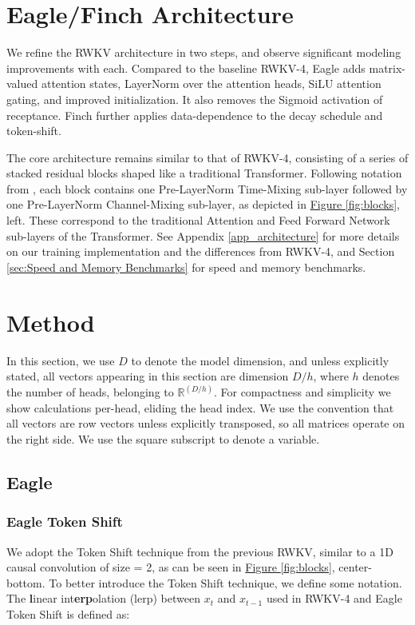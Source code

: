 \section{Eagle/Finch Architecture}\label{sec:rwkv_model}
We refine the RWKV architecture in two steps, and observe significant modeling improvements with each. Compared to the baseline RWKV-4, Eagle adds matrix-valued attention states, LayerNorm over the attention heads, SiLU attention gating, and improved initialization. It also removes the Sigmoid activation of receptance. Finch further applies data-dependence to the decay schedule and token-shift.

The core architecture remains similar to that of RWKV-4, consisting of a series of stacked residual blocks shaped like a traditional Transformer. Following notation from \citep{NEURIPS2021mixer}, each block contains one Pre-LayerNorm Time-Mixing sub-layer followed by one Pre-LayerNorm Channel-Mixing sub-layer, as depicted in \hyperref[fig:blocks]{Figure \ref*{fig:blocks}}, left. These correspond to the traditional Attention and Feed Forward Network sub-layers of the Transformer. See Appendix \ref{app_architecture} for more details on our training implementation and the differences from RWKV-4, and Section \ref{sec:Speed and Memory Benchmarks} for speed and memory benchmarks.

\section{Method}\label{sec:method}
In this section, we use $D$ to denote the model dimension, and unless explicitly stated, all vectors appearing in this section are dimension $D/h$, where $h$ denotes the number of heads, belonging to $\mathbb{R}^{(D/h)}$. For compactness and simplicity we show calculations per-head, eliding the head index. We use the convention that all vectors are row vectors unless explicitly transposed, so all matrices operate on the right side. We use the square subscript to denote a variable.

\subsection{Eagle}

\subsubsection{Eagle Token Shift}

We adopt the Token Shift technique from the previous RWKV, similar to a 1D causal convolution of size = 2, as can be seen in \hyperref[fig:blocks]{Figure \ref*{fig:blocks}}, center-bottom. To better introduce the Token Shift technique, we define some notation. The \textbf{l}inear int\textbf{erp}olation (lerp) between $x_t$ and $x_{t-1}$ used in RWKV-4 and Eagle Token Shift is defined as:

